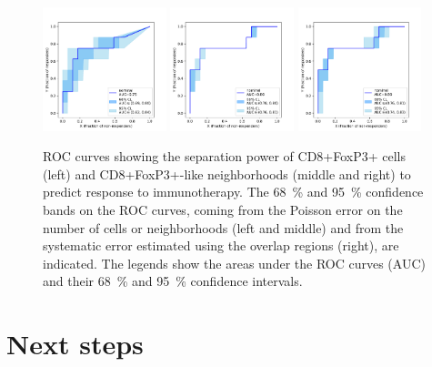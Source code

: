 \documentclass[11pt]{article}
\begin{document}
\begin{figure}
\begin{center}
\includegraphics[width=0.32\textwidth]{poisson_roc_cells.pdf}
\includegraphics[width=0.32\textwidth]{poisson_roc_neighborhoods.pdf}
\includegraphics[width=0.32\textwidth]{lognormal_roc_neighborhoods.pdf}
\caption{ROC curves \autocite{SITC2023poster} showing the separation power of CD8+FoxP3+ cells (left) and CD8+FoxP3+-like neighborhoods (middle and right) to predict response to immunotherapy.  The \qty{68}{\%} and \qty{95}{\%} confidence bands on the ROC curves, coming from the Poisson error on the number of cells or neighborhoods (left and middle) and from the systematic error estimated using the overlap regions (right), are indicated.  The legends show the areas under the ROC curves (AUC) and their \qty{68}{\%} and \qty{95}{\%} confidence intervals.\label{fig:exampleroc_systematics_mc}}
\end{center}
\end{figure}

\section{Next steps}
\end{document}
